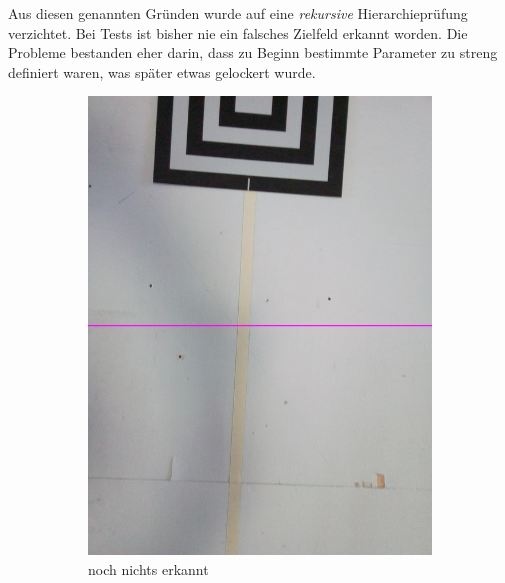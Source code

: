 Aus diesen genannten Gründen wurde auf eine \textit{rekursive} Hierarchieprüfung verzichtet. Bei Tests ist bisher nie ein falsches Zielfeld erkannt worden. Die Probleme bestanden eher darin, dass zu Beginn bestimmte Parameter zu streng definiert waren, was später etwas gelockert wurde.

\begin{figure}
    \centering
    \begin{subfigure}{0.3\textwidth}
        \centering
        \includegraphics[width=0.95\linewidth]{pics/zielfeld/01.jpg}
        \caption{noch nichts erkannt}
        \label{fig:zielfeld1}
    \end{subfigure}
    \begin{subfigure}{0.3\textwidth}
        \centering

\end{subfigure}
\end{figure}
